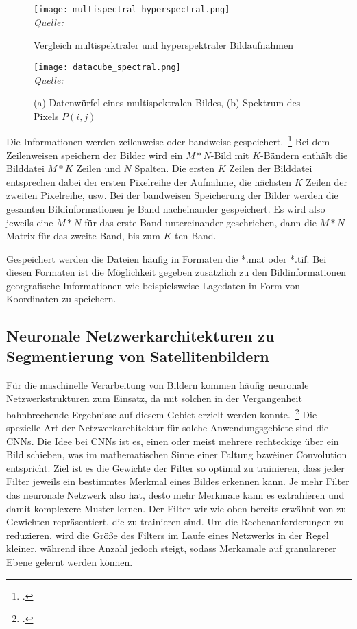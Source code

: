 \begin{figure}[H]
    \caption {Vergleich multispektraler und hyperspektraler Bildaufnahmen}\label{fig:multispectral_hyperspectral}
    \texttt{[image: multispectral\_hyperspectral.png]}
    \\
    \textit{Quelle:~\cite[][]{ibraheem.2015}}
    \\
\end{figure}

\begin{figure}[H]
    \caption {(a) Datenwürfel eines multispektralen Bildes, (b) Spektrum des Pixels \(P(i,j)\)}
    \label{fig:datacube_multispectral}
    \texttt{[image: datacube\_spectral.png]}
    \\
    \textit{Quelle:~\cite[][]{ibraheem.2015}}
    \\
\end{figure}

Die Informationen werden zeilenweise oder bandweise gespeichert.~\footcite[\vglf][]{upadhyay.2012}
Bei dem Zeilenweisen speichern der Bilder wird ein \(M*N\)-Bild mit \(K\)-Bändern enthält die Bilddatei \(M*K\) Zeilen
und \(N\) Spalten.
Die ersten \(K\) Zeilen der Bilddatei entsprechen dabei der ersten Pixelreihe der Aufnahme, die nächsten \(K\) Zeilen
der zweiten Pixelreihe, usw.
Bei der bandweisen Speicherung der Bilder werden die gesamten Bildinformationen je Band nacheinander gespeichert.
Es wird also jeweils eine \(M*N\) für das erste Band untereinander geschrieben, dann die \(M*N\)-Matrix für das zweite
Band, bis zum \(K\)-ten Band.

Gespeichert werden die Dateien häufig in Formaten die *.mat oder *.tif.
Bei diesen Formaten ist die Möglichkeit gegeben zusätzlich zu den Bildinformationen georgrafische Informationen wie
beispielsweise Lagedaten in Form von Koordinaten zu speichern.

\subsection{Neuronale Netzwerkarchitekturen zu Segmentierung von Satellitenbildern}

Für die maschinelle Verarbeitung von Bildern kommen häufig neuronale Netzwerkstrukturen zum Einsatz, da mit solchen in
der Vergangenheit bahnbrechende Ergebnisse auf diesem Gebiet erzielt werden konnte.~\footcite[\vglf][]{pritt.2020}
Die spezielle Art der Netzwerkarchitektur für solche Anwendungsgebiete sind die \ac{CNNs}.
Die Idee bei \ac{CNNs} ist es, einen oder meist mehrere rechteckige \grqq über ein Bild schieben, was im
mathematischen Sinne einer Faltung bzw\. einer Convolution entspricht.
Ziel ist es die Gewichte der Filter so optimal zu trainieren, dass jeder Filter jeweils ein bestimmtes Merkmal eines Bildes
erkennen kann.
Je mehr Filter das neuronale Netzwerk also hat, desto mehr Merkmale kann es extrahieren und damit komplexere Muster lernen.
Der Filter wir wie oben bereits erwähnt von zu Gewichten repräsentiert, die zu trainieren sind.
Um die Rechenanforderungen zu reduzieren, wird die Größe des Filters im Laufe eines Netzwerks in der Regel kleiner,
während ihre Anzahl jedoch steigt, sodass Merkamale auf granularerer Ebene gelernt werden können.

